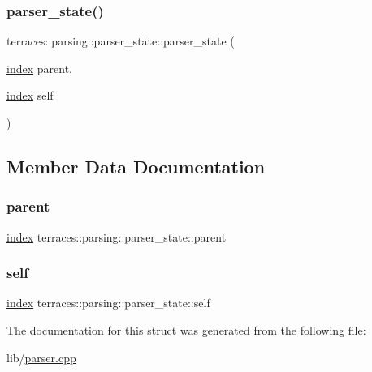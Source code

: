 \subsubsection{\texorpdfstring{parser\+\_\+state()}{parser\_state()}}
{\footnotesize\ttfamily terraces\+::parsing\+::parser\+\_\+state\+::parser\+\_\+state (\begin{DoxyParamCaption}\item[{\hyperlink{namespaceterraces_adbc33ccb543d1634e96d0eb02e472c77}{index}}]{parent,  }\item[{\hyperlink{namespaceterraces_adbc33ccb543d1634e96d0eb02e472c77}{index}}]{self }\end{DoxyParamCaption})\hspace{0.3cm}{\ttfamily [inline]}}



\subsection{Member Data Documentation}
\mbox{\label{structterraces_1_1parsing_1_1parser__state_a3cae4795f4aa78de14cfaf743d24d12e}} 
\subsubsection{\texorpdfstring{parent}{parent}}
{\footnotesize\ttfamily \hyperlink{namespaceterraces_adbc33ccb543d1634e96d0eb02e472c77}{index} terraces\+::parsing\+::parser\+\_\+state\+::parent}

\mbox{\label{structterraces_1_1parsing_1_1parser__state_a4312748dd4f312d8f3022f485866c69c}} 
\subsubsection{\texorpdfstring{self}{self}}
{\footnotesize\ttfamily \hyperlink{namespaceterraces_adbc33ccb543d1634e96d0eb02e472c77}{index} terraces\+::parsing\+::parser\+\_\+state\+::self}



The documentation for this struct was generated from the following file\+:\begin{DoxyCompactItemize}
\item 
lib/\hyperlink{lib_2parser_8cpp}{parser.\+cpp}\end{DoxyCompactItemize}
